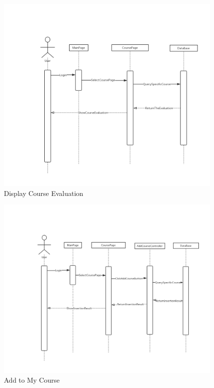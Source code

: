 \documentclass[16pt]{scrreprt}
\begin{document}
\begin{figure}[H]
    \includegraphics[width=\linewidth]{./FuncPhoto/9.png}   
    \caption{Display Course Evaluation}
\end{figure}

\begin{figure}[H]
    \includegraphics[width=\linewidth]{./FuncPhoto/10.png}   
    \caption{Add to My Course}
\end{figure}
\end{document}

